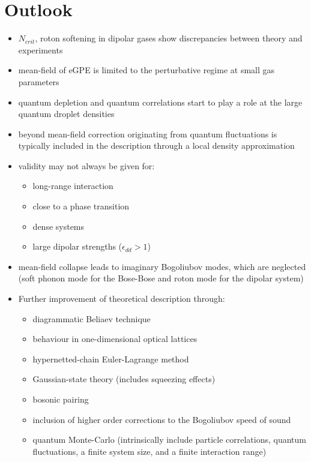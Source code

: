 \section{Outlook}
\begin{itemize}
    \item $N_{crit}$, roton softening in dipolar gases show discrepancies between theory and experiments
    \item mean-field of eGPE is limited to the perturbative regime at small gas parameters
    \item quantum depletion and quantum correlations start to play a role at the
        large quantum droplet densities
    \item beyond mean-field correction originating from quantum fluctuations is typically included in the description through a local density approximation
    \item validity may not always be given for:
    \begin{itemize}
        \item long-range interaction
        \item close to a phase transition
        \item dense systems
        \item large dipolar strengths ($\epsilon_{dd} > 1$)
    \end{itemize}

    \item mean-field collapse leads to imaginary Bogoliubov modes, which are neglected (soft phonon mode for the Bose-Bose and roton mode for the dipolar system)
    \item Further improvement of theoretical description through:
    \begin{itemize}
        \item diagrammatic Beliaev technique
        \item behaviour in one-dimensional optical lattices
        \item hypernetted-chain Euler-Lagrange method
        \item Gaussian-state theory (includes squeezing effects)
        \item bosonic pairing
        \item inclusion of higher order corrections to the Bogoliubov speed of sound
        \item quantum Monte-Carlo (intrinsically include particle correlations, quantum fluctuations, a finite
system size, and a finite interaction range)
    \end{itemize}


\end{itemize}
